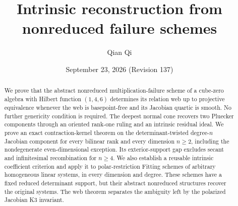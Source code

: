 \title[Intrinsic reconstruction from failure schemes]{Intrinsic reconstruction from nonreduced failure schemes}
\author{Qian Qi}
\date{September 23, 2026 \quad (Revision 137)}
\begin{abstract}
We prove that the abstract nonreduced multiplication-failure scheme
of a cube-zero algebra with Hilbert function \((1,4,6)\) determines
its relation web up to projective equivalence whenever the web is
basepoint-free and its Jacobian quartic is smooth.  No further
genericity condition is required.  The deepest normal cone recovers
two Pluecker components through an oriented rank-one ruling and an
intrinsic residual ideal.  We prove an exact contraction-kernel theorem
on the determinant-twisted degree-\(n\) Jacobian component for every
bilinear rank and every dimension \(n\ge2\), including the
nondegenerate even-dimensional exception.  Its exterior-support gap
excludes secant and infinitesimal recombination for \(n\ge4\).
We also establish a reusable intrinsic coefficient criterion and apply
it to polar-restriction Fitting schemes of arbitrary homogeneous linear
systems, in every dimension and degree.  These schemes have a fixed
reduced determinant support, but their abstract nonreduced structures
recover the original systems.  The web theorem separates the ambiguity
left by the polarized Jacobian K3 invariant.
\end{abstract}
\maketitle
